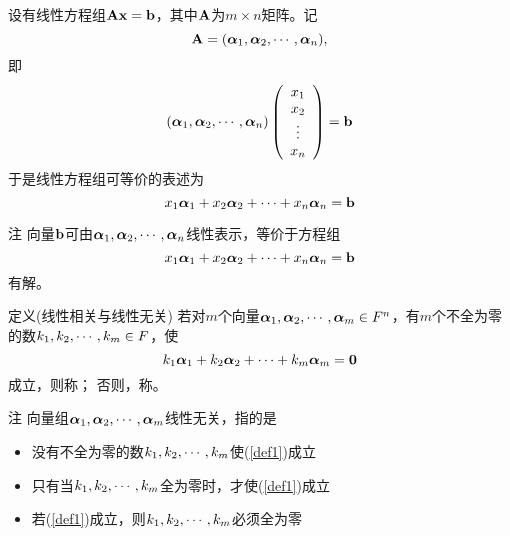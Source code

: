 \begin{frame}
  \begin{footnotesize}
    设有线性方程组$\mathbf{A}\mathbf{x}=\mathbf{b}$，其中$\mathbf{A}$为$m\times n$矩阵。记
    $$\mathbf{A}=(\boldsymbol{\alpha}_1,\boldsymbol{\alpha}_2,\cdots,\boldsymbol{\alpha}_n),$$
    即
    $$
    (\boldsymbol{\alpha}_1,\boldsymbol{\alpha}_2,\cdots,\boldsymbol{\alpha}_n) \left(
    \begin{array}{c}
      x_1\\
      x_2\\
      \vdots\\
      x_n
    \end{array}
    \right)=\mathbf{b}
    $$
    于是线性方程组可等价的表述为
    $$
    x_1\boldsymbol{\alpha}_1+x_2\boldsymbol{\alpha}_2+\cdots+x_n\boldsymbol{\alpha}_n=\mathbf{b}
    $$
    \begin{block}{注}
      向量$\mathbf{b}$可由$\boldsymbol{\alpha}_1,\boldsymbol{\alpha}_2,\cdots,\boldsymbol{\alpha}_n$线性表示，等价于方程组
      $$
      x_1\boldsymbol{\alpha}_1+x_2\boldsymbol{\alpha}_2+\cdots+x_n\boldsymbol{\alpha}_n=\mathbf{b}
      $$
      有解。
    \end{block}
  \end{footnotesize}
\end{frame}

\begin{frame}
  \begin{footnotesize}
    \begin{block}{定义(线性相关与线性无关)}
      若对$m$个向量$\boldsymbol{\alpha}_1,\boldsymbol{\alpha}_2,\cdots,\boldsymbol{\alpha}_m\in F^n$，有$m$个不全为零的数$k_1,k_2,\cdots,k_m\in F$，使
      \begin{equation}\label{def1}
        k_1\boldsymbol{\alpha}_1 + k_2\boldsymbol{\alpha}_2+\cdots + k_m\boldsymbol{\alpha}_m = \mathbf{0}        
      \end{equation}
      成立，则称；
      否则，称。
    \end{block}

    \pause
    \begin{block}{注}
      向量组$\boldsymbol{\alpha}_1,\boldsymbol{\alpha}_2,\cdots,\boldsymbol{\alpha}_m$线性无关，指的是
      \begin{itemize}
      \item 没有不全为零的数$k_1,k_2,\cdots,k_m$使(\ref{def1})成立 \\[0.1in]
      \item 只有当$k_1,k_2,\cdots,k_m$全为零时，才使(\ref{def1})成立 \\[0.1in]
      \item 若(\ref{def1})成立，则$k_1,k_2,\cdots,k_m$必须全为零
      \end{itemize}
    \end{block}
  \end{footnotesize}
\end{frame}

